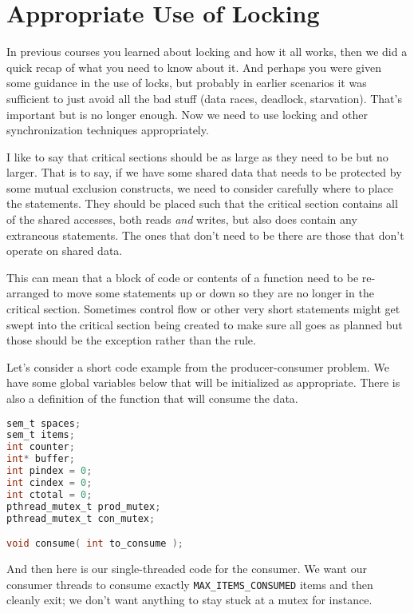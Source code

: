




\section*{Appropriate Use of Locking}

In previous courses you learned about locking and how it all works, then we did a quick recap of what you need to know about it. And perhaps you were given some guidance in the use of locks, but probably in earlier scenarios it was sufficient to just avoid all the bad stuff (data races, deadlock, starvation). That's important but is no longer enough. Now we need to use locking and other synchronization techniques appropriately. 

I like to say that critical sections should be as large as they need to be but no larger. That is to say, if we have some shared data that needs to be protected by some mutual exclusion constructs, we need to consider carefully where to place the statements. They should be placed such that the critical section contains all of the shared accesses, both reads \textit{and} writes, but also does contain any extraneous statements. The ones that don't need to be there are those that don't operate on shared data. 

This can mean that a block of code or contents of a function need to be re-arranged to move some statements up or down so they are no longer in the critical section. Sometimes control flow or other very short statements might get swept into the critical section being created to make sure all goes as planned but those should be the exception rather than the rule.

Let's consider a short code example from the producer-consumer problem. We have some global variables below that will be initialized as appropriate. There is also a definition of the function that will consume the data.

\begin{lstlisting}[language=C]
sem_t spaces;
sem_t items;
int counter;
int* buffer;
int pindex = 0;
int cindex = 0;
int ctotal = 0;
pthread_mutex_t prod_mutex;
pthread_mutex_t con_mutex;

void consume( int to_consume );

\end{lstlisting}

And then here is our single-threaded code for the consumer. We want our consumer threads to consume exactly {\tt MAX\_ITEMS\_CONSUMED} items and then cleanly exit; we don't want anything to stay stuck at a mutex for instance.

